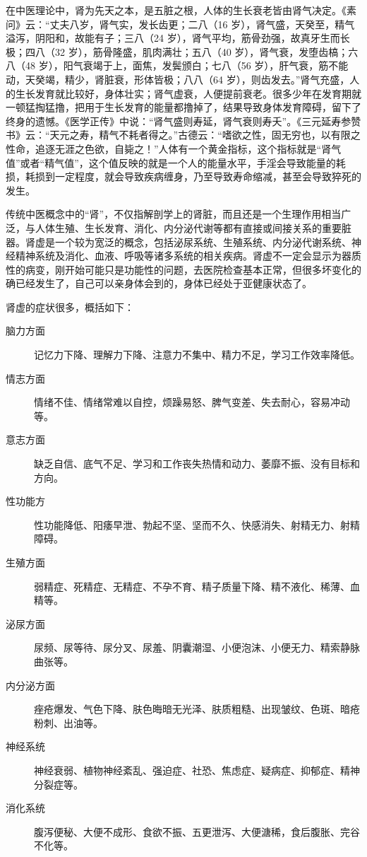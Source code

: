 在中医理论中，肾为先天之本，是五脏之根，人体的生长衰老皆由肾气决定。《素问》云：“丈夫八岁，肾气实，发长齿更；二八（16 岁），肾气盛，天癸至，精气溢泻，阴阳和，故能有子；三八（24 岁），肾气平均，筋骨劲强，故真牙生而长极；四八（32 岁），筋骨隆盛，肌肉满壮；五八（40 岁），肾气衰，发堕齿槁；六八（48 岁），阳气衰竭于上，面焦，发鬓颁白；七八（56 岁），肝气衰，筋不能动，天癸竭，精少，肾脏衰，形体皆极；八八（64 岁），则齿发去。”肾气充盛，人的生长发育就比较好，身体壮实；肾气虚衰，人便提前衰老。很多少年在发育期就一顿猛掏猛撸，把用于生长发育的能量都撸掉了，结果导致身体发育障碍，留下了终身的遗憾。《医学正传》中说：“肾气盛则寿延，肾气衰则寿夭”。《三元延寿参赞书》云：“天元之寿，精气不耗者得之。”古德云：“嗜欲之性，固无穷也，以有限之性命，追逐无涯之色欲，自毙之！”人体有一个黄金指标，这个指标就是“肾气值”或者“精气值”，这个值反映的就是一个人的能量水平，手淫会导致能量的耗损，耗损到一定程度，就会导致疾病缠身，乃至导致寿命缩减，甚至会导致猝死的发生。

传统中医概念中的“肾”，不仅指解剖学上的肾脏，而且还是一个生理作用相当广泛，与人体生殖、生长发育、消化、内分泌代谢等都有直接或间接关系的重要脏器。肾虚是一个较为宽泛的概念，包括泌尿系统、生殖系统、内分泌代谢系统、神经精神系统及消化、血液、呼吸等诸多系统的相关疾病。肾虚不一定会显示为器质性的病变，刚开始可能只是功能性的问题，去医院检查基本正常，但很多坏变化的确已经发生了，自己可以亲身体会到的，身体已经处于亚健康状态了。

肾虚的症状很多，概括如下：

\begin{description}
    \item[脑力方面] 记忆力下降、理解力下降、注意力不集中、精力不足，学习工作效率降低。
    \item[情志方面] 情绪不佳、情绪常难以自控，烦躁易怒、脾气变差、失去耐心，容易冲动等。
    \item[意志方面] 缺乏自信、底气不足、学习和工作丧失热情和动力、萎靡不振、没有目标和方向。
    \item[性功能方] 性功能降低、阳痿早泄、勃起不坚、坚而不久、快感消失、射精无力、射精障碍。
    \item[生殖方面] 弱精症、死精症、无精症、不孕不育、精子质量下降、精不液化、稀薄、血精等。
    \item[泌尿方面] 尿频、尿等待、尿分叉、尿羞、阴囊潮湿、小便泡沫、小便无力、精索静脉曲张等。
    \item[内分泌方面] 痤疮爆发、气色下降、肤色晦暗无光泽、肤质粗糙、出现皱纹、色斑、暗疮粉刺、出油等。
    \item[神经系统] 神经衰弱、植物神经紊乱、强迫症、社恐、焦虑症、疑病症、抑郁症、精神分裂症等。
    \item[消化系统] 腹泻便秘、大便不成形、食欲不振、五更泄泻、大便溏稀，食后腹胀、完谷不化等。
\end{description}

